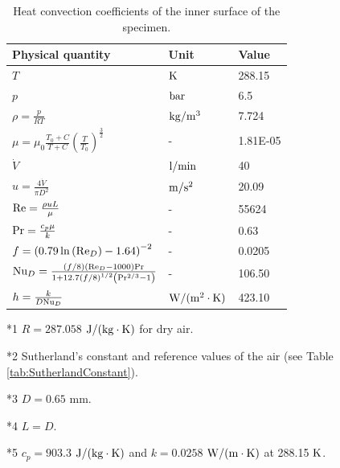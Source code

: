 \documentclass[preprint,5p,twocolumn,11pt,sort&compress]{elsarticle}
\begin{document}
\begin{table}[htbp]
\centering
  \begin{threeparttable}
  \centering
  \caption{Heat convection coefficients of the inner surface of the specimen.}
    \begin{tabular}{p{6cm}p{3cm}p{3cm}}
    \toprule
    Physical quantity   & Unit & Value  \\
    \midrule
    $T$   & ${\rm{K}}$ & 288.15  \\
    $p$   & ${\rm{bar}}$ & 6.5   \\
    $\rho  = \frac{p}{{RT}}$ \tnote{*1} & ${\rm{kg/}}{{\rm{m}}^{\rm{3}}}$ & 7.724 \\
    $\mu  = {\mu _0}\frac{{{T_0} + C}}{{T + C}}{\left( {\frac{T}{{{T_0}}}} \right)^{\frac{3}{2}}}$ \tnote{*2} & -     & 1.81E-05 \\
    ${\dot V}$ & ${\rm{l/min}}$ & 40  \\
    $u = \frac{{4\dot V}}{{\pi {D^2}}}$ \tnote{*3} & ${\rm{m/}}{{\rm{s}}^2}$ & 20.09  \\
    ${\rm{Re}} = \frac{{\rho uL}}{\mu }$ \tnote{*4} & -     & 55624  \\
    ${\rm{Pr}} = \frac{{{c_p}\mu }}{k}$ \tnote{*5} & -     & 0.63  \\
    $f = {\left( {0.79\ln \left( {{\rm{R}}{{\rm{e}}_D}} \right) - 1.64} \right)^{ - 2}}$ & -     & 0.0205  \\
    ${\rm{N}}{{\rm{u}}_D} = \frac{{\left( {f/8} \right)\left( {{\rm{R}}{{\rm{e}}_D} - 1000} \right){\rm{Pr}}}}{{1 + 12.7{{(f/8)}^{1/2}}\left( {{\rm{P}}{{\rm{r}}^{2/3}} - 1} \right)}}$ & -     & 106.50  \\
    $h = \frac{k}{{D{\rm{N}}{{\rm{u}}_D}}}$ & ${\rm{W/(}}{{\rm{m}}^{\rm{2}}} \cdot {\rm{K)}}$ & 423.10  \\
    \bottomrule
    \end{tabular}%
    \begin{tablenotes}
    \item[*1] $R = 287.058$ ${\rm{J/(kg}} \cdot {\rm{K}})$ for dry air.
    \item[*2] Sutherland's constant and reference values of the air (see Table \autoref{tab:SutherlandConstant}).
    \item[*3] $D=0.65$ mm.
    \item[*4] $L=D$.
    \item[*5] $c_{p}=903.3$ ${\rm{J/(kg}} \cdot {\rm{K}})$ and $k=0.0258$ ${\rm{W/(m}} \cdot {\rm{K}})$ at 288.15 ${\rm{K}}$.
    \end{tablenotes}
    \end{threeparttable}
  \label{tab:addlabel}%
\end{table}%
\renewcommand\arraystretch{1}
\end{document}

